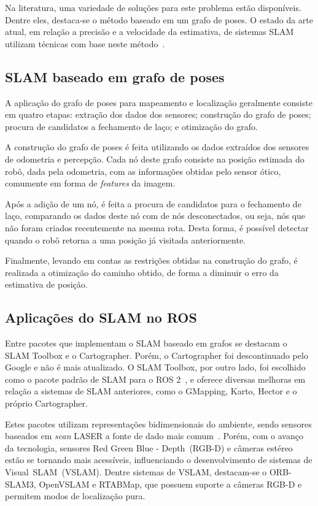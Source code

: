 \documentclass[repeatfields,xlists,xpacks,oneside,yearsonly]{ufrgscca}
\begin{document}
Na literatura, uma variedade de soluções para este problema estão
disponíveis. Dentre eles, destaca-se o método baseado em um grafo de
poses. O estado da arte atual, em relação a precisão e a velocidade
da estimativa, de sistemas SLAM utilizam técnicas com base neste
método~\cite{graph_slam_tutorial}.


\subsection{SLAM baseado em grafo de poses}

A aplicação do grafo de poses para mapeamento e localização
geralmente consiste em quatro etapas: extração dos dados dos
sensores; construção do grafo de poses; procura de candidatos a
fechamento de laço; e otimização do grafo.

A construção do grafo de poses é feita utilizando os dados extraídos
dos sensores de odometria e percepção. Cada nó deste grafo consiste
na posição estimada do robô, dada pela odometria, com as informações
obtidas pelo sensor ótico, comumente em forma de \textit{features} da
imagem.

Após a adição de um nó, é feita a procura de candidatos para o
fechamento de laço, comparando os dados deste nó com de nós
desconectados, ou seja, nós que não foram criados recentemente na
mesma rota. Desta forma, é possível detectar quando o robô retorna a
uma posição já visitada anteriormente.

Finalmente, levando em contas as restrições obtidas na construção do
grafo, é realizada a otimização do caminho obtido, de forma a
diminuir o erro da estimativa de posição.

\subsection{Aplicações do SLAM no ROS}

Entre pacotes que implementam o SLAM baseado em grafos se destacam o
SLAM Toolbox e o Cartographer. Porém, o Cartographer foi
descontinuado pelo Google e não é mais atualizado. O SLAM Toolbox,
por outro lado, foi escolhido como o pacote padrão de SLAM para o ROS
2~\cite{slam_toolbox_ros_standard}, e oferece diversas melhoras em
relação a sistemas de SLAM anteriores, como o GMapping, Karto, Hector
e o próprio Cartographer.

Estes pacotes utilizam representações bidimensionais do ambiente,
sendo sensores baseados em \textit{scan} LASER a fonte de dado mais
comum~\cite{SensorAndSLAM}. Porém, com o avanço da tecnologia,
sensores Red Green Blue - Depth~(RGB-D) e câmeras estéreo estão se
tornando mais acessíveis, influenciando o desenvolvimento de sistemas
de Visual~SLAM~(VSLAM). Dentre sistemas de VSLAM, destacam-se o
ORB-SLAM3, OpenVSLAM e RTABMap, que possuem suporte a câmeras RGB-D e
permitem modos de localização pura.
\end{document}
